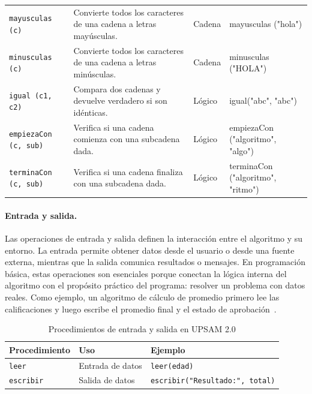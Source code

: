 \documentclass[12pt,twoside]{book}
\begin{document}
\begin{table}[!hbt]
\begin{tabularx}{\textwidth}{
										>{\raggedright\arraybackslash}p{3.0cm}
										>{\raggedright\arraybackslash}X
										>{\raggedright\arraybackslash}p{2.4cm}
										Y
									}
									\texttt{mayusculas (c)}
									& Convierte todos los caracteres de una cadena a letras mayúsculas.
									& Cadena
									& mayusculas ("hola") \\
									
									\texttt{minusculas (c)}
									& Convierte todos los caracteres de una cadena a letras minúsculas.
									& Cadena
									& minusculas ("HOLA") \\
									
									\texttt{igual (c1, c2)}
									& Compara dos cadenas y devuelve verdadero si son idénticas.
									& Lógico
									& igual("abc", "abc") \\
									
									\texttt{empiezaCon (c, sub)}
									& Verifica si una cadena comienza con una subcadena dada.
									& Lógico
									& empiezaCon ("algoritmo", "algo") \\
									
									\texttt{terminaCon (c, sub)}
									& Verifica si una cadena finaliza con una subcadena dada.
									& Lógico
									& terminaCon ("algoritmo", "ritmo") \\
									\hline
								\end{tabularx}
							\end{table}
							
						\paragraph{Entrada y salida.}
							Las operaciones de entrada y salida definen la interacción entre el algoritmo y su entorno. La entrada permite obtener datos desde el usuario o desde una fuente externa, mientras que la salida comunica resultados o mensajes. En programación básica, estas operaciones son esenciales porque conectan la lógica interna del algoritmo con el propósito práctico del programa: resolver un problema con datos reales. Como ejemplo, un algoritmo de cálculo de promedio primero lee las calificaciones y luego escribe el promedio final y el estado de aprobación~\cite{Gaddis2022Starting}.
							
							\begin{table}[h]
								\centering
								\caption{Procedimientos de entrada y salida en UPSAM 2.0}
								\label{tab:upsam_io}
								\begin{tabular}{lll}
									\hline
									\textbf{Procedimiento} & \textbf{Uso} & \textbf{Ejemplo} \\
									\hline
									\texttt{leer} & Entrada de datos & \texttt{leer(edad)} \\
									\texttt{escribir} & Salida de datos & \texttt{escribir("Resultado:", total)} \\
									\hline
								\end{tabular}
							\end{table}
				
\end{document}
